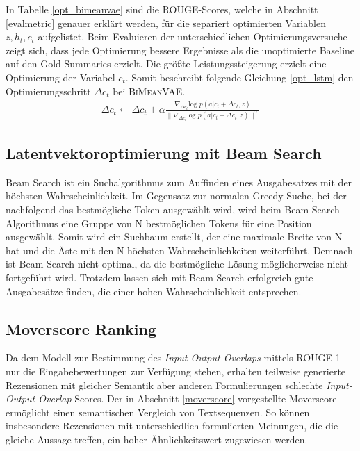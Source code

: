 In Tabelle \ref{opt_bimeanvae} sind die ROUGE-Scores, welche in Abschnitt \ref*{evalmetric} genauer erklärt werden, für die separiert optimierten Variablen $z, h_t, c_t$ aufgelistet.
Beim Evaluieren der unterschiedlichen Optimierungsversuche zeigt sich, dass jede Optimierung bessere Ergebnisse als die unoptimierte Baseline auf den Gold-Summaries erzielt.
Die größte Leistungssteigerung erzielt eine Optimierung der Variabel $c_t$.
Somit beschreibt folgende Gleichung \ref{opt_lstm} den Optimierungsschritt $\Delta c_t$ bei \textsc{BiMeanVAE}.
\begin{align}
    \Delta c_t \leftarrow \Delta c_t + \alpha \frac{\nabla_{\Delta c_t} \text{log }p(a|c_t+\Delta c_t,z)}{\| \nabla_{\Delta c_t} \text{log }p(a|c_t +\Delta c_t ,z )\|^\gamma} \label{opt_lstm}
\end{align}


\pagebreak %
\subsection{Latentvektoroptimierung mit Beam Search}
Beam Search ist ein Suchalgorithmus zum Auffinden eines Ausgabesatzes mit der höchsten Wahrscheinlichkeit. 
Im Gegensatz zur normalen Greedy Suche, bei der nachfolgend das bestmögliche Token ausgewählt wird, wird beim Beam Search Algorithmus eine Gruppe von N bestmöglichen Tokens für eine Position ausgewählt. 
Somit wird ein Suchbaum erstellt, der eine maximale Breite von N hat und die Äste mit den N höchsten Wahrscheinlichkeiten weiterführt. 
Demnach ist Beam Search nicht optimal, da die bestmögliche Lösung möglicherweise nicht fortgeführt wird. Trotzdem lassen sich mit Beam Search erfolgreich gute Ausgabesätze finden, die einer hohen Wahrscheinlichkeit entsprechen.

\subsection{Moverscore Ranking}
\label{moverscore_ranking}
Da dem Modell zur Bestimmung des \textit{Input-Output-Overlaps} mittels ROUGE-1 nur die Eingabebewertungen zur Verfügung stehen, erhalten teilweise generierte Rezensionen mit gleicher Semantik aber anderen Formulierungen schlechte  \textit{Input-Output-Overlap}-Scores.
Der in Abschnitt \ref{moverscore} vorgestellte Moverscore ermöglicht einen semantischen Vergleich von Textsequenzen. 
So können insbesondere Rezensionen mit unterschiedlich formulierten Meinungen, die die gleiche Aussage treffen, ein hoher Ähnlichkeitswert zugewiesen werden.

